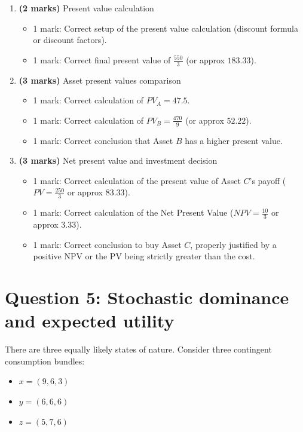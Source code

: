 \documentclass[12pt]{article}
\begin{document}
\begin{enumerate}[label=(\alph*)]
\item \textbf{(2 marks)} Present value calculation
\begin{itemize}
\item 1 mark: Correct setup of the present value calculation (discount formula or discount factors).
\item 1 mark: Correct final present value of $\frac{550}{3}$ (or approx $183.33$).
\end{itemize}

\item \textbf{(3 marks)} Asset present values comparison
\begin{itemize}
\item 1 mark: Correct calculation of $PV_A = 47.5$.
\item 1 mark: Correct calculation of $PV_B = \frac{470}{9}$ (or approx $52.22$).
\item 1 mark: Correct conclusion that Asset $B$ has a higher present value.
\end{itemize}

\item \textbf{(3 marks)} Net present value and investment decision
\begin{itemize}
\item 1 mark: Correct calculation of the present value of Asset $C$'s payoff ($PV = \frac{250}{3}$ or approx $83.33$).
\item 1 mark: Correct calculation of the Net Present Value ($NPV = \frac{10}{3}$ or approx $3.33$).
\item 1 mark: Correct conclusion to buy Asset $C$, properly justified by a positive NPV or the PV being strictly greater than the cost.
\end{itemize}
\end{enumerate}

\newpage
\section*{Question 5: Stochastic dominance and expected utility}

There are three equally likely states of nature. Consider three contingent consumption bundles:
\begin{itemize}
\item $x = (9, 6, 3)$
\item $y = (6, 6, 6)$
\item $z = (5, 7, 6)$
\end{itemize}
\end{document}
